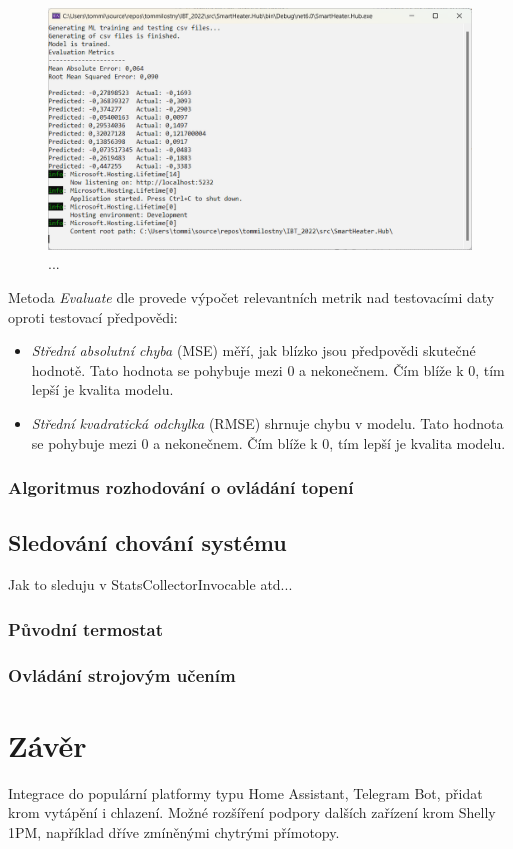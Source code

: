 \begin{figure}[hbt]
\includegraphics[width=\textwidth]{obrazky-figures/ml-training.png}
\caption{  ... }
\end{figure}

\noindent Metoda {\it Evaluate} dle \cite{mlnet_tutorial} provede výpočet relevantních metrik nad testovacími daty oproti testovací předpovědi:
\begin{itemize}
    \item {\it Střední absolutní chyba} (MSE) měří, jak blízko jsou předpovědi skutečné hodnotě. Tato hodnota se pohybuje mezi 0 a nekonečnem. Čím blíže k 0, tím lepší je kvalita modelu.
    \item {\it Střední kvadratická odchylka} (RMSE) shrnuje chybu v modelu. Tato hodnota se pohybuje mezi 0 a nekonečnem. Čím blíže k 0, tím lepší je kvalita modelu.
\end{itemize}


\subsection{Algoritmus rozhodování o ovládání topení}


\section{Sledování chování systému}
Jak to sleduju v StatsCollectorInvocable atd...


\subsection{Původní termostat}



\subsection{Ovládání strojovým učením}


\chapter{Závěr}
\label{zaver}

Integrace do populární platformy typu Home Assistant, Telegram Bot, přidat krom vytápění i chlazení. Možné rozšíření podpory dalších zařízení krom Shelly 1PM, například dříve zmíněnými chytrými přímotopy.

